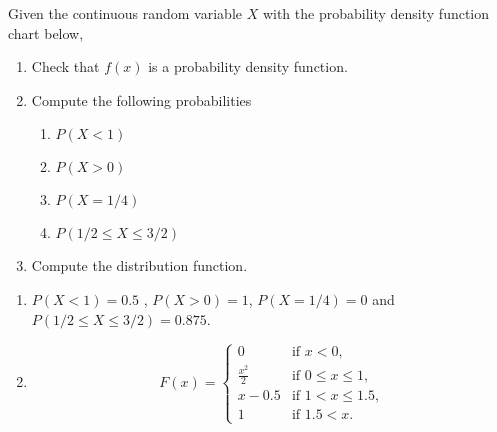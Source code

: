 {Given the continuous random variable $X$ with the probability density function chart below, 
\begin{center}
\scalebox{0.7}{}
\end{center}
\begin{enumerate}
\item Check that $f(x)$ is a probability density function.
\item Compute the following probabilities
\begin{enumerate}
\item $P(X<1)$
\item $P(X>0)$
\item $P(X=1/4)$
\item $P(1/2\leq X\leq 3/2)$
\end{enumerate}
\item Compute the distribution function.
\end{enumerate}
}
{
\begin{enumerate}[start=2]
\item $P(X<1)=0.5$ , $P(X>0)=1$, $P(X=1/4)=0$ and $P(1/2\leq X\leq 3/2)=0.875$.
\item \[
F(x)=
\begin{cases}
0 & \mbox{if $x<0$,}\\
\frac{x^2}{2} & \mbox{if $0\leq x\leq 1$,}\\
x-0.5 & \mbox{if $1<x\leq 1.5$,}\\
1 & \mbox{if $1.5<x$.}
\end{cases}
\]
\end{enumerate}
}
{}


